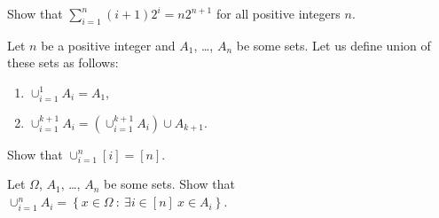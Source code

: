 \documentclass[addpoints]{exam}
\begin{document}
  \pagestyle{headandfoot}
  \runningheadrule

  \firstpagefooter{}{}{}
  \runningfooter{}{}{}
  \begin{flushright}

    \vspace{0.2in}
  \end{flushright}

  \begin{questions}
    \question
      Show that $\sum_{i = 1}^n (i + 1) 2^i = n 2^{n + 1}$ for all positive integers
			$n$.

      \begin{solution}[\stretch{1}]
      \end{solution}
      \newpage
    \question
      Let $n$ be a positive integer and $A_1$, \dots, $A_n$ be some sets.
			Let us define union of these sets as follows:
			\begin{enumerate}
			    \item $\cup_{i = 1}^1 A_i = A_1$,
			    \item $\cup_{i = 1}^{k + 1} A_i =
			        (\cup_{i = 1}^{k + 1} A_i) \cup A_{k + 1}$.
			\end{enumerate}
			
			Show that $\cup_{i = 1}^n [i] = [n]$.

      \begin{solution}[\stretch{1}]
      \end{solution}
      \newpage
    \question
      Let $\Omega$, $A_1$, \dots, $A_n$ be some sets.
			Show that
			$\cup_{i = 1}^n A_i =
			    \left\{x \in \Omega ~:~ \exists i \in [n] \  x \in A_i \right\}$.

      \begin{solution}[\stretch{1}]
      \end{solution}
      \newpage
  \end{questions}
\end{document}
